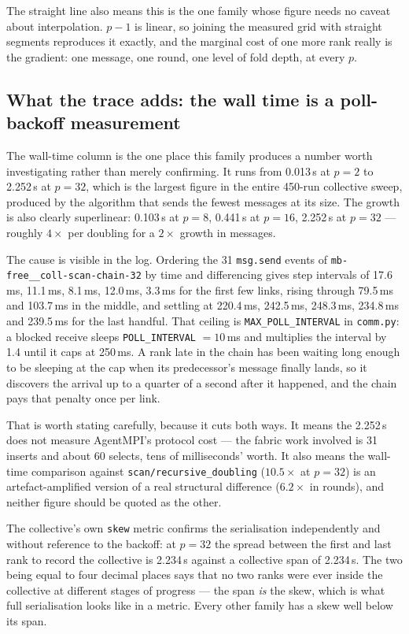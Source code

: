 \documentclass[11pt]{article}
\begin{document}
The straight line also means this is the one family whose figure needs no caveat about
interpolation. $p-1$ is linear, so joining the measured grid with straight segments reproduces it
exactly, and the marginal cost of one more rank really is the gradient: one message, one round,
one level of fold depth, at every $p$.

\subsection{What the trace adds: the wall time is a poll-backoff measurement}

The wall-time column is the one place this family produces a number worth investigating rather
than merely confirming. It runs from 0.013\,s at $p=2$ to 2.252\,s at $p=32$, which is the largest
figure in the entire 450-run collective sweep, produced by the algorithm that sends the fewest
messages at its size. The growth is also clearly superlinear: 0.103\,s at $p=8$, 0.441\,s at
$p=16$, 2.252\,s at $p=32$ --- roughly $4\times$ per doubling for a $2\times$ growth in messages.

The cause is visible in the log. Ordering the 31 \texttt{msg.send} events of
\texttt{mb-free\_\_coll-scan-chain-32} by time and differencing gives step intervals of 17.6\,ms,
11.1\,ms, 8.1\,ms, 12.0\,ms, 3.3\,ms for the first few links, rising through 79.5\,ms and
103.7\,ms in the middle, and settling at 220.4\,ms, 242.5\,ms, 248.3\,ms, 234.8\,ms and 239.5\,ms
for the last handful. That ceiling is \texttt{MAX\_POLL\_INTERVAL} in \texttt{comm.py}: a blocked
receive sleeps \texttt{POLL\_INTERVAL} $= 10$\,ms and multiplies the interval by 1.4 until it caps
at 250\,ms. A rank late in the chain has been waiting long enough to be sleeping at the cap when
its predecessor's message finally lands, so it discovers the arrival up to a quarter of a second
after it happened, and the chain pays that penalty once per link.

That is worth stating carefully, because it cuts both ways. It means the 2.252\,s does not measure
AgentMPI's protocol cost --- the fabric work involved is 31 inserts and about 60 selects, tens of
milliseconds' worth. It also means the wall-time comparison against
\texttt{scan/recursive\_doubling} ($10.5\times$ at $p=32$) is an artefact-amplified version of a
real structural difference ($6.2\times$ in rounds), and neither figure should be quoted as the
other.

The collective's own \texttt{skew} metric confirms the serialisation independently and without
reference to the backoff: at $p=32$ the spread between the first and last rank to record the
collective is 2.234\,s against a collective span of 2.234\,s. The two being equal to four decimal
places says that no two ranks were ever inside the collective at different stages of progress ---
the span \emph{is} the skew, which is what full serialisation looks like in a metric. Every other
family has a skew well below its span.
\end{document}
